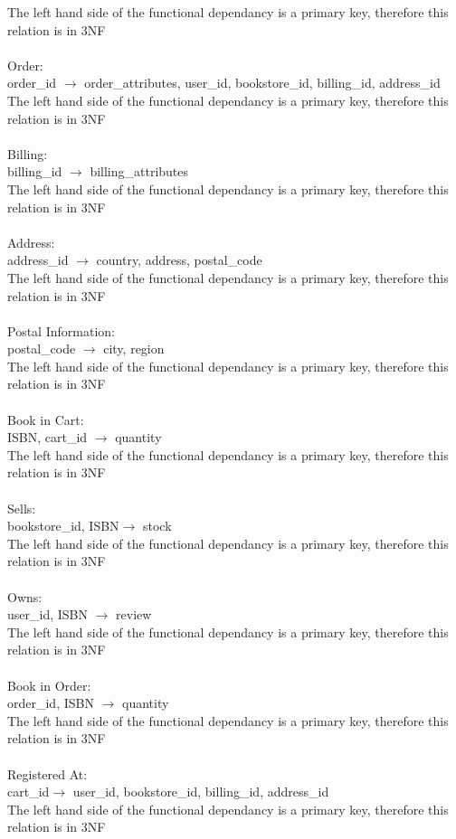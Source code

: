 \documentclass{article}
\begin{document}
The left hand side of the functional dependancy is a primary key, therefore this relation is in 3NF\\\\
Order:\\
order\_id $\rightarrow$  order\_attributes, user\_id, bookstore\_id, billing\_id, address\_id\\
The left hand side of the functional dependancy is a primary key, therefore this relation is in 3NF\\\\
Billing:\\
billing\_id $\rightarrow$  billing\_attributes\\
The left hand side of the functional dependancy is a primary key, therefore this relation is in 3NF\\\\
Address: \\
address\_id $\rightarrow$ country, address, postal\_code\\
The left hand side of the functional dependancy is a primary key, therefore this relation is in 3NF\\\\
Postal Information:\\
 postal\_code $\rightarrow$ city, region\\
The left hand side of the functional dependancy is a primary key, therefore this relation is in 3NF\\\\
Book in Cart:\\
 ISBN, cart\_id $\rightarrow$ quantity\\
The left hand side of the functional dependancy is a primary key, therefore this relation is in 3NF\\\\
Sells:\\
 bookstore\_id, ISBN$\rightarrow$ stock\\
The left hand side of the functional dependancy is a primary key, therefore this relation is in 3NF\\\\
Owns:\\
user\_id, ISBN $\rightarrow$ review \\
The left hand side of the functional dependancy is a primary key, therefore this relation is in 3NF\\\\
Book in Order:\\
 order\_id, ISBN $\rightarrow$ quantity\\
The left hand side of the functional dependancy is a primary key, therefore this relation is in 3NF\\\\
Registered At:\\
cart\_id$\rightarrow$ user\_id, bookstore\_id, billing\_id, address\_id\\
The left hand side of the functional dependancy is a primary key, therefore this relation is in 3NF\\\\
\end{document}
